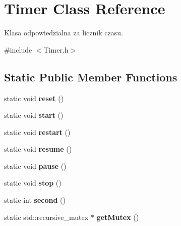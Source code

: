 \hypertarget{class_timer}{}\section{Timer Class Reference}
\label{class_timer}


Klasa odpowiedzialna za licznik czasu.  




{\ttfamily \#include $<$Timer.\+h$>$}

\subsection*{Static Public Member Functions}
\begin{DoxyCompactItemize}
\item 
\hypertarget{class_timer_a9020542d73357a4eef512eefaf57524b}{}static void {\bfseries reset} ()\label{class_timer_a9020542d73357a4eef512eefaf57524b}

\item 
\hypertarget{class_timer_a3a8b5272198d029779dc9302a54305a8}{}static void {\bfseries start} ()\label{class_timer_a3a8b5272198d029779dc9302a54305a8}

\item 
\hypertarget{class_timer_aa3f7871196bb56202af2bc982bfbfff6}{}static void {\bfseries restart} ()\label{class_timer_aa3f7871196bb56202af2bc982bfbfff6}

\item 
\hypertarget{class_timer_a4ac55a73bb3431db9d4d2fd70ae9a2e8}{}static void {\bfseries resume} ()\label{class_timer_a4ac55a73bb3431db9d4d2fd70ae9a2e8}

\item 
\hypertarget{class_timer_ab2a6e0b9d6b9c93c06c89ff6dd6291c1}{}static void {\bfseries pause} ()\label{class_timer_ab2a6e0b9d6b9c93c06c89ff6dd6291c1}

\item 
\hypertarget{class_timer_a63f0eb44b27402196590a03781515dba}{}static void {\bfseries stop} ()\label{class_timer_a63f0eb44b27402196590a03781515dba}

\item 
\hypertarget{class_timer_a2e2f6c73ec2eefe72042f3c52a632806}{}static int {\bfseries second} ()\label{class_timer_a2e2f6c73ec2eefe72042f3c52a632806}

\item 
\hypertarget{class_timer_a6998144d90d80227e9dd7451556f5ff6}{}static std\+::recursive\+\_\+mutex $\ast$ {\bfseries get\+Mutex} ()\label{class_timer_a6998144d90d80227e9dd7451556f5ff6}


\end{DoxyCompactItemize}
